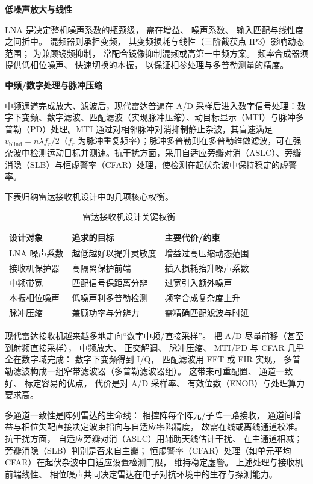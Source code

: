 \medskip\noindent\textbf{低噪声放大与线性}

LNA 是决定整机噪声系数的瓶颈级，
需在增益、
噪声系数、
输入匹配与线性度之间折中。
混频器则承担变频，
其变频损耗与线性（三阶截获点 IP3）影响动态范围；
为兼顾镜频抑制，
常配合镜像抑制混频或高第一中频方案。
频率合成器须提供低相位噪声、
快速切换的本振，
以保证相参处理与多普勒测量的精度。

\medskip\noindent\textbf{中频/数字处理与脉冲压缩}

中频通道完成放大、滤波后，现代雷达普遍在 A/D 采样后进入数字信号处理：数字下变频、数字滤波、匹配滤波（实现脉冲压缩）、动目标显示（MTI）与脉冲多普勒（PD）处理。MTI 通过对相邻脉冲对消抑制静止杂波，其盲速满足 $v_{\mathrm{blind}}=n\lambda f_r/2$（$f_r$ 为脉冲重复频率）；脉冲多普勒则在多普勒维做滤波，可在强杂波中检测运动目标并测速。抗干扰方面，采用自适应旁瓣对消（ASLC）、旁瓣消隐（SLB）与恒虚警率（CFAR）处理，使检测在起伏杂波中保持稳定的虚警率。

下表归纳雷达接收机设计中的几项核心权衡。

\begin{table}[htbp]
\centering
\caption{雷达接收机设计关键权衡}
\begin{tabular}{|p{4.4cm}|p{5.6cm}|p{5.0cm}|}
\hline
\textbf{设计对象} & \textbf{追求的目标} & \textbf{主要代价/约束} \\
\hline
LNA 噪声系数 & 越低越好以提升灵敏度 & 增益过高压缩动态范围 \\
\hline
接收机保护器 & 高隔离保护前端 & 插入损耗抬升噪声系数 \\
\hline
中频带宽 & 匹配信号保距离分辨 & 过宽引入额外噪声 \\
\hline
本振相位噪声 & 低噪声利多普勒检测 & 频率合成复杂度上升 \\
\hline
脉冲压缩 & 兼顾功率与分辨力 & 需精确匹配滤波与时延 \\
\hline
\end{tabular}
\end{table}

现代雷达接收机越来越多地走向“数字中频/直接采样”。
把 A/D 尽量前移（甚至到射频直接采样），
中频放大、
正交解调、
脉冲压缩、
MTI/PD 与 CFAR 几乎全在数字域完成：
数字下变频得到 I/Q，
匹配滤波用 FFT 或 FIR 实现，
多普勒滤波构成一组窄带滤波器（多普勒滤波器组）。
这带来可重配置、
通道一致好、
标定容易的优点，
代价是对 A/D 采样率、
有效位数（ENOB）与处理算力要求高。

多通道一致性是阵列雷达的生命线：
相控阵每个阵元/子阵一路接收，
通道间增益与相位失配直接决定波束指向与自适应零陷精度，
故需在线或离线通道校准。
抗干扰方面，
自适应旁瓣对消（ASLC）用辅助天线估计干扰、
在主通道相减；
旁瓣消隐（SLB）判别是否来自主瓣；
恒虚警率（CFAR）处理（如单元平均 CFAR）在起伏杂波中自适应设置检测门限，
维持稳定虚警。
上述处理与接收机前端线性、
相位噪声共同决定雷达在电子对抗环境中的生存与探测能力。

